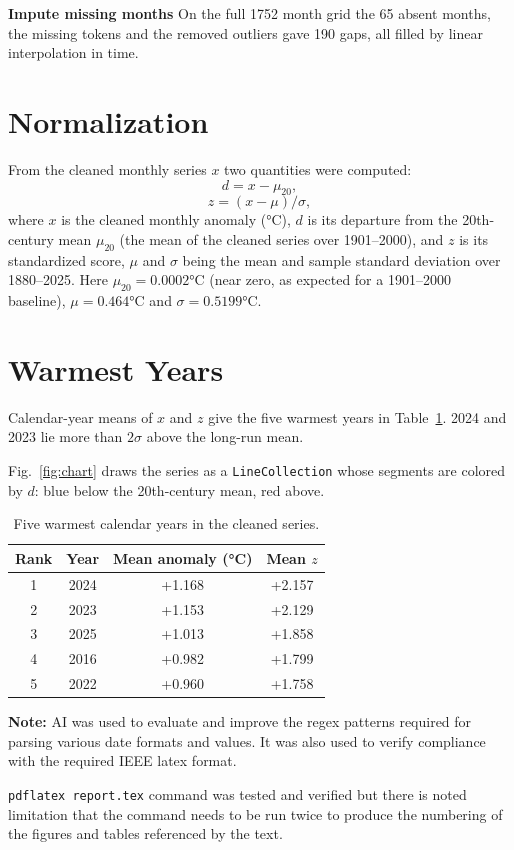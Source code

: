\documentclass[conference]{IEEEtran}
\begin{document}
\textbf{Impute missing months}
On the full 1752 month grid the 65 absent months, the missing tokens and the removed outliers gave 190 gaps, all filled by linear interpolation in time.

\section{Normalization}
From the cleaned monthly series $x$ two quantities were computed:
\begin{equation}
d = x - \mu_{20}, \label{eq:d}
\end{equation}
\begin{equation}
z = (x - \mu)/\sigma, \label{eq:z}
\end{equation}
where $x$ is the cleaned monthly anomaly (\si{\celsius}), $d$ is its departure from the 20th-century mean $\mu_{20}$ (the mean of the cleaned series over 1901--2000), and $z$ is its standardized score, $\mu$ and $\sigma$ being the mean and sample standard deviation over 1880--2025. Here $\mu_{20}=0.0002$\si{\celsius} (near zero, as expected for a 1901--2000 baseline), $\mu=0.464$\si{\celsius} and $\sigma=0.5199$\si{\celsius}.

\section{Warmest Years}
Calendar-year means of $x$ and $z$ give the five warmest years in Table~\ref{tab:top5}. 2024 and 2023 lie more than $2\sigma$ above the long-run mean.

Fig.~\ref{fig:chart} draws the series as a \texttt{LineCollection} whose segments are colored by $d$: blue below the 20th-century mean, red above.

\begin{table}[!htbp]
\caption{Five warmest calendar years in the cleaned series.}
\label{tab:top5}
\centering
\begin{tabular}{@{}cccc@{}}
\toprule
Rank & Year & Mean anomaly (\si{\celsius}) & Mean $z$ \\
\midrule
1 & 2024 & +1.168 & +2.157 \\
2 & 2023 & +1.153 & +2.129 \\
3 & 2025 & +1.013 & +1.858 \\
4 & 2016 & +0.982 & +1.799 \\
5 & 2022 & +0.960 & +1.758 \\
\bottomrule
\end{tabular}
\end{table}

\textbf{Note:} AI was used to evaluate and improve the regex patterns required for parsing various date formats and values. It was also used to verify compliance with the required IEEE latex format.

\texttt{pdflatex report.tex} command was tested and verified but there is noted limitation that the command needs to be run twice to produce the numbering of the figures and tables referenced by the text.
\end{document}
